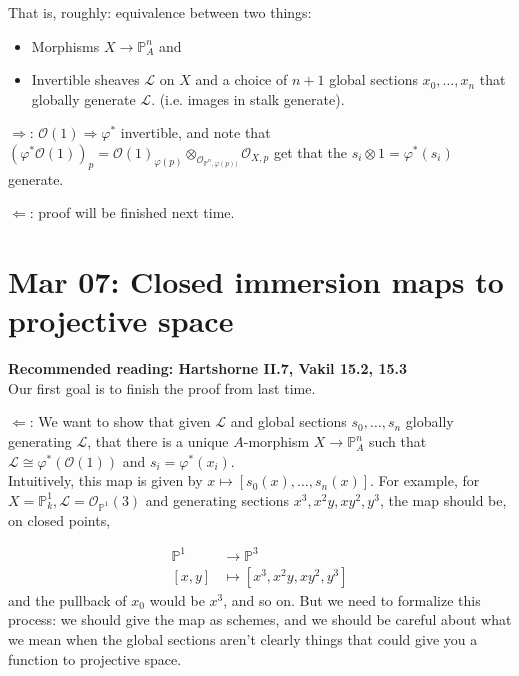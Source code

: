 \documentclass[10pt,reqno]{amsart}
\theoremstyle{definition}
\theoremstyle{remark}
\numberwithin{equation}{section}
\numberwithin{theorem}{section}
\newcommand{\OO}{{\mathcal O}}
\newcommand{\LL}{{\mathscr L}}
\newcommand{\PP}{{\mathbb P}}
\begin{document}
That is, roughly: equivalence between two things:
\begin{itemize}
\item Morphisms $X \to \PP^n_A$ and
\item Invertible sheaves $\LL$ on $X$ and a choice of $n+1$ global sections $x_0,\dots,x_n$ that globally generate $\LL$. (i.e. images in stalk generate).
\end{itemize}

$\Rightarrow$: $\OO(1) \Rightarrow \varphi^*$ invertible, and note that $(\varphi^*\OO(1))_p = \OO(1)_{\varphi(p)} \otimes_{\OO_{\PP^n,\varphi(p))}} \OO_{X,p}$
get that the $s_i \otimes 1 = \varphi^*(s_i)$ generate.

$\Leftarrow$: proof will be finished next time.

\section{Mar 07: Closed immersion maps to projective space}
\textbf{Recommended reading: Hartshorne II.7, Vakil 15.2, 15.3}
\\

Our first goal is to finish the proof from last time.

$\Leftarrow$: We want to show that given $\LL$ and global sections $s_0,\dots,s_n$ globally generating $\LL$, that there is a unique $A$-morphism $X \to \PP^n_A$ such that $\LL \cong \varphi^*(\OO(1))$ and $s_i = \varphi^*(x_i)$. 
\\

Intuitively, this map is given by $x \mapsto [s_0(x),\dots,s_n(x)]$. For example, for $X = \PP^1_k, \LL = \OO_{\PP^1}(3)$ and generating sections $x^3,x^2y,xy^2,y^3$, the map should be, on closed points,

\begin{align*}
\PP^1 &\to \PP^3\\
[x,y] &\mapsto [x^3,x^2y,xy^2,y^3]
\end{align*}
and the pullback of $x_0$ would be $x^3$, and so on. But we need to formalize this process: we should give the map as schemes, and we should be careful about what we mean when the global sections aren't clearly things that could give you a function to projective space.
\\
\end{document}
